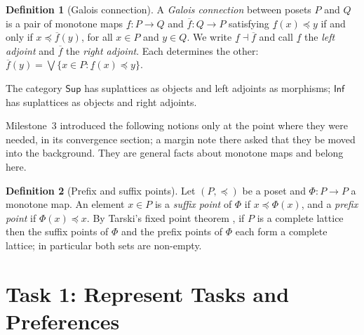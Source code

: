 \documentclass[11pt]{article}
\newif\ifshowcomments
\renewcommand{\preceq}{\preccurlyeq}
\newcommand{\cat}[1]{\mathsf{#1}}
\theoremstyle{definition}
\newtheorem{definition}{Definition}
\theoremstyle{remark}
\newcommand{\prompt}[1]{%
    \ifshowcomments
        ~\todo[inline, color=techgold!80, textcolor=black,caption={Task}]{{\bf Prompt:} #1}%
    \fi
}
\begin{document}
\begin{definition}[Galois connection]
A \emph{Galois connection} between posets $P$ and $Q$ is a pair of monotone maps
$\underline{f} : P \to Q$ and $\overline{f} : Q \to P$ satisfying
$\underline{f}(x) \preceq y$ if and only if $x \preceq \overline{f}(y)$, for all $x \in P$ and
$y \in Q$.
We write $\underline{f} \dashv \overline{f}$ and call $\underline{f}$ the \emph{left adjoint}
and $\overline{f}$ the \emph{right adjoint}.
Each determines the other: $\overline{f}(y) = \bigvee\{x \in P : \underline{f}(x) \preceq y\}$.
\end{definition}

The category $\cat{Sup}$ has suplattices as objects and left adjoints as morphisms;
$\cat{Inf}$ has suplattices as objects and right adjoints.

Milestone~3 introduced the following notions only at the point where they were needed, in its
convergence section; a margin note there asked that they be moved into the background.
They are general facts about monotone maps and belong here.

\begin{definition}[Prefix and suffix points]
\label{def:fixed-points}
Let $(P, \preceq)$ be a poset and $\Phi : P \to P$ a monotone map.
An element $x \in P$ is a \emph{suffix point} of $\Phi$ if $x \preceq \Phi(x)$, and a
\emph{prefix point} if $\Phi(x) \preceq x$.
By Tarski's fixed point theorem \citep{Tarski1955}, if $P$ is a complete lattice then the
suffix points of $\Phi$ and the prefix points of $\Phi$ each form a complete lattice; in
particular both sets are non-empty.
\end{definition}

\section{Task 1: Represent Tasks and Preferences}
\label{sec:task1}

\prompt{This task establishes the mathematical groundwork by representing tasks (e.g., path
planning, formation control) as convex programs within categories enriched over the extended
real numbers, using the bifunction approach for compositional modeling. Preferences over tasks
are modeled using categories enriched over the booleans, capturing agents' discrete choices.}
\end{document}
